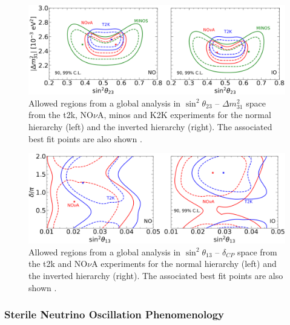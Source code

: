 \begin{figure}[h!]
    \centering
    \includegraphics[width = \hugefigwidth]{figures-chap2/theta_23_1.png}   
    \caption[Allowed regions in $\sin^2{\theta_{23}}$ -- $\Delta m^2_{31}$ space from the \gls{t2k}, NO$\nu$A, \gls{minos} and K2K experiments.]{Allowed regions from a global analysis in $\sin^2{\theta_{23}}$ -- $\Delta m^2_{31}$ space from the \gls{t2k}, NO$\nu$A, \gls{minos} and K2K experiments for the normal hierarchy (left) and the inverted hierarchy (right). The associated best fit points are also shown
    \cite{2020_global_reassessment_of_the_neutrino_oscillation_picture}.}
    \label{fig:t2k_nova_minos_k2k}
\end{figure}

\begin{figure}[h!]
    \centering
    \includegraphics[width = \hugefigwidth]{figures-chap2/CP.png}
    \caption[Allowed regions in $\sin^2{\theta_{13}}$ -- $\delta_{CP}$ space from the \gls{t2k} and NO$\nu$A experiments.]{Allowed regions from a global analysis in $\sin^2{\theta_{13}}$ -- $\delta_{CP}$ space from the \gls{t2k} and NO$\nu$A experiments for the normal hierarchy (left) and the inverted hierarchy (right). The associated best fit points are also shown
    \cite{2020_global_reassessment_of_the_neutrino_oscillation_picture}.}
    \label{fig:t2k_nova_CP}
\end{figure}

\newpage
\subsubsection{Sterile Neutrino Oscillation Phenomenology}

